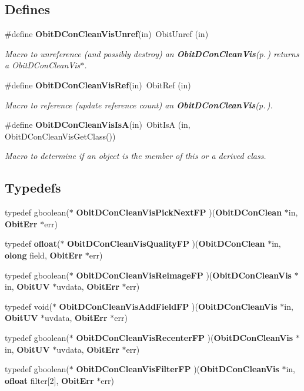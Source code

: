 \subsection*{Defines}
\begin{CompactItemize}
\item 
\#define {\bf Obit\-DCon\-Clean\-Vis\-Unref}(in)\ Obit\-Unref (in)
\begin{CompactList}\small\item\em Macro to unreference (and possibly destroy) an {\bf Obit\-DCon\-Clean\-Vis}{\rm (p.\,\pageref{structObitDConCleanVis})} returns a Obit\-DCon\-Clean\-Vis$\ast$. \item\end{CompactList}\item 
\#define {\bf Obit\-DCon\-Clean\-Vis\-Ref}(in)\ Obit\-Ref (in)
\begin{CompactList}\small\item\em Macro to reference (update reference count) an {\bf Obit\-DCon\-Clean\-Vis}{\rm (p.\,\pageref{structObitDConCleanVis})}. \item\end{CompactList}\item 
\#define {\bf Obit\-DCon\-Clean\-Vis\-Is\-A}(in)\ Obit\-Is\-A (in, Obit\-DCon\-Clean\-Vis\-Get\-Class())
\begin{CompactList}\small\item\em Macro to determine if an object is the member of this or a derived class. \item\end{CompactList}\end{CompactItemize}
\subsection*{Typedefs}
\begin{CompactItemize}
\item 
typedef gboolean($\ast$ {\bf Obit\-DCon\-Clean\-Vis\-Pick\-Next\-FP} )({\bf Obit\-DCon\-Clean} $\ast$in, {\bf Obit\-Err} $\ast$err)
\item 
typedef {\bf ofloat}($\ast$ {\bf Obit\-DCon\-Clean\-Vis\-Quality\-FP} )({\bf Obit\-DCon\-Clean} $\ast$in, {\bf olong} field, {\bf Obit\-Err} $\ast$err)
\item 
typedef gboolean($\ast$ {\bf Obit\-DCon\-Clean\-Vis\-Reimage\-FP} )({\bf Obit\-DCon\-Clean\-Vis} $\ast$in, {\bf Obit\-UV} $\ast$uvdata, {\bf Obit\-Err} $\ast$err)
\item 
typedef void($\ast$ {\bf Obit\-DCon\-Clean\-Vis\-Add\-Field\-FP} )({\bf Obit\-DCon\-Clean\-Vis} $\ast$in, {\bf Obit\-UV} $\ast$uvdata, {\bf Obit\-Err} $\ast$err)
\item 
typedef gboolean($\ast$ {\bf Obit\-DCon\-Clean\-Vis\-Recenter\-FP} )({\bf Obit\-DCon\-Clean\-Vis} $\ast$in, {\bf Obit\-UV} $\ast$uvdata, {\bf Obit\-Err} $\ast$err)
\item 
typedef gboolean($\ast$ {\bf Obit\-DCon\-Clean\-Vis\-Filter\-FP} )({\bf Obit\-DCon\-Clean\-Vis} $\ast$in, {\bf ofloat} filter[2], {\bf Obit\-Err} $\ast$err)
\end{CompactItemize}
